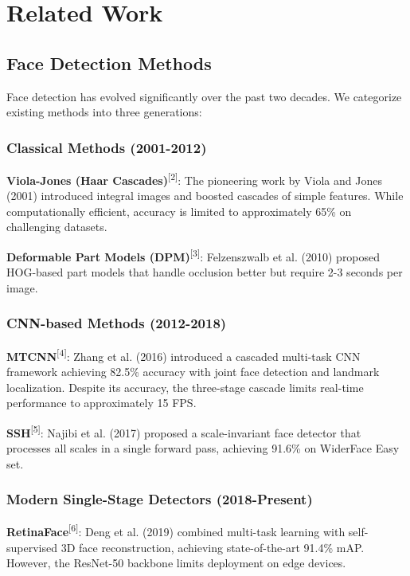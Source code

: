 \documentclass[12pt,a4paper]{article}
\begin{document}
\section{Related Work}

\subsection{Face Detection Methods}

Face detection has evolved significantly over the past two decades. We categorize existing methods into three generations:

\subsubsection{Classical Methods (2001-2012)}

\textbf{Viola-Jones (Haar Cascades)}\textsuperscript{[2]}: The pioneering work by Viola and Jones (2001) introduced integral images and boosted cascades of simple features. While computationally efficient, accuracy is limited to approximately 65\% on challenging datasets.

\textbf{Deformable Part Models (DPM)}\textsuperscript{[3]}: Felzenszwalb et al. (2010) proposed HOG-based part models that handle occlusion better but require 2-3 seconds per image.

\subsubsection{CNN-based Methods (2012-2018)}

\textbf{MTCNN}\textsuperscript{[4]}: Zhang et al. (2016) introduced a cascaded multi-task CNN framework achieving 82.5\% accuracy with joint face detection and landmark localization. Despite its accuracy, the three-stage cascade limits real-time performance to approximately 15 FPS.

\textbf{SSH}\textsuperscript{[5]}: Najibi et al. (2017) proposed a scale-invariant face detector that processes all scales in a single forward pass, achieving 91.6\% on WiderFace Easy set.

\subsubsection{Modern Single-Stage Detectors (2018-Present)}

\textbf{RetinaFace}\textsuperscript{[6]}: Deng et al. (2019) combined multi-task learning with self-supervised 3D face reconstruction, achieving state-of-the-art 91.4\% mAP. However, the ResNet-50 backbone limits deployment on edge devices.
\end{document}
